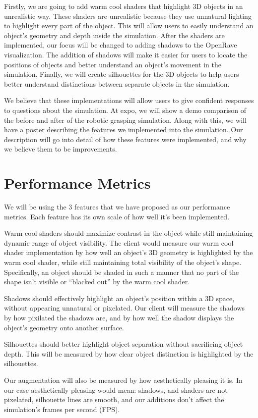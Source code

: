 \documentclass[10pt,journal,compsoc]{IEEEtran}
\begin{document}
Firstly, we are going to add warm cool shaders that highlight 3D objects in an unrealistic way. 
These shaders are unrealistic because they use unnatural lighting to highlight every part of the object. 
This will allow users to easily understand an object’s geometry and depth inside the simulation.
After the shaders are implemented, our focus will be changed to adding shadows to the OpenRave visualization. 
The addition of shadows will make it easier for users to locate the positions of objects and better understand an object’s movement in the simulation. 
Finally, we will create silhouettes for the 3D objects to help users better understand distinctions between separate objects in the simulation. \par

We believe that these implementations will allow users to give confident responses to questions about the simulation.
At expo, we will show a demo comparison of the before and after of the robotic grasping simulation. 
Along with this, we will have a poster describing the features we implemented into the simulation. 
Our description will go into detail of how these features were implemented, and why we believe them to be improvements.

\section{Performance Metrics}
We will be using the 3 features that we have proposed as our performance metrics.
Each feature has its own scale of how well it’s been implemented. \par
Warm cool shaders should maximize contrast in the object while still maintaining dynamic range of object visibility. 
The client would measure our warm cool shader implementation by how well an object’s 3D geometry is highlighted by the warm cool shader, while still maintaining total visibility of the object’s shape. 
Specifically, an object should be shaded in such a manner that no part of the shape isn’t visible or “blacked out” by the warm cool shader. \par
Shadows should effectively highlight an object’s position within a 3D space, without appearing unnatural or pixelated. 
Our client will measure the shadows by how pixilated the shadows are, and by how well the shadow displays the object’s geometry onto another surface. \par
Silhouettes should better highlight object separation without sacrificing object depth. 
This will be measured by how clear object distinction is highlighted by the silhouettes. \par
Our augmentation will also be measured by how aesthetically pleasing it is. 
In our case aesthetically pleasing would mean: shadows, and shaders are not pixelated, silhouette lines are smooth, and our additions don’t affect the simulation’s frames per second (FPS).  
\end{document}
